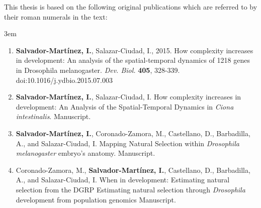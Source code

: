
\vspace{1cm}

This thesis is based on the following original publications which are referred to by their roman numerals in the text:

\vspace{1.5cm}

%
\renewcommand*{\thefootnote}{\fnsymbol{footnote}}

\begin{flushleft}
\leftskip3em
\rightskip\leftskip
\normalsize{

\begin{enumerate}[label=\Roman*]
  \item  \textbf{Salvador-Mart\'{i}nez, I.}, Salazar-Ciudad, I., 2015. 
  How complexity increases in development: An analysis of the spatial-temporal dynamics of 1218 genes in Drosophila melanogaster.
   \textit{Dev. Biol.} \textbf{405}, 328-339. doi:10.1016/j.ydbio.2015.07.003
  \vspace{0.5cm}
    
  \item  \textbf{Salvador-Mart\'{i}nez, I.}, Salazar-Ciudad, I. 
  How complexity increases in development: An Analysis of the Spatial-Temporal Dynamics in \textit{Ciona intestinalis}. Manuscript.
  \vspace{0.5cm}

  \item \textbf{Salvador-Mart\'{i}nez, I.\footnotemark[1]}, Coronado-Zamora, M.\footnotemark[1], Castellano, D.\footnotemark[1], Barbadilla, A., and Salazar-Ciudad, I. 
  Mapping Natural Selection within \textit{Drosophila melanogaster} embryo's anatomy.
   Manuscript.
  \vspace{0.5cm}
  
  \item  Coronado-Zamora, M.\footnotemark[1], \textbf{Salvador-Mart\'{i}nez, I.\footnotemark[1]}, Castellano, D., Barbadilla, A., and Salazar-Ciudad, I. 
  When in development: Estimating natural selection from the DGRP Estimating natural selection through \textit{Drosophila} development from population genomics
Manuscript.
  
\end{enumerate}
%
\renewcommand*{\thefootnote}{\arabic{footnote}}
%
}
\end{flushleft}

